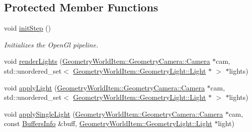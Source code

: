 \subsection*{Protected Member Functions}
\begin{DoxyCompactItemize}
\item 
\mbox{\label{class_geometry_engine_1_1_geometry_render_step_1_1_lighting_pass_aaab2ea74a9710f22887c266af1985490}} 
void \mbox{\hyperlink{class_geometry_engine_1_1_geometry_render_step_1_1_lighting_pass_aaab2ea74a9710f22887c266af1985490}{init\+Step}} ()
\begin{DoxyCompactList}\small\item\em Initializes the Open\+Gl pipeline. \end{DoxyCompactList}\item 
void \mbox{\hyperlink{class_geometry_engine_1_1_geometry_render_step_1_1_lighting_pass_a437ff10a7ef9e7529a4852389a5cf871}{render\+Lights}} (\mbox{\hyperlink{class_geometry_engine_1_1_geometry_world_item_1_1_geometry_camera_1_1_camera}{Geometry\+World\+Item\+::\+Geometry\+Camera\+::\+Camera}} $\ast$cam, std\+::unordered\+\_\+set$<$ \mbox{\hyperlink{class_geometry_engine_1_1_geometry_world_item_1_1_geometry_light_1_1_light}{Geometry\+World\+Item\+::\+Geometry\+Light\+::\+Light}} $\ast$ $>$ $\ast$lights)
\item 
void \mbox{\hyperlink{class_geometry_engine_1_1_geometry_render_step_1_1_lighting_pass_a9d0a0f3b9d52036b9d4f9fbee353cd10}{apply\+Light}} (\mbox{\hyperlink{class_geometry_engine_1_1_geometry_world_item_1_1_geometry_camera_1_1_camera}{Geometry\+World\+Item\+::\+Geometry\+Camera\+::\+Camera}} $\ast$cam, std\+::unordered\+\_\+set$<$ \mbox{\hyperlink{class_geometry_engine_1_1_geometry_world_item_1_1_geometry_light_1_1_light}{Geometry\+World\+Item\+::\+Geometry\+Light\+::\+Light}} $\ast$ $>$ $\ast$lights)
\item 
void \mbox{\hyperlink{class_geometry_engine_1_1_geometry_render_step_1_1_lighting_pass_a958341b3bf1f95dfb56bc5b2833813b0}{apply\+Single\+Light}} (\mbox{\hyperlink{class_geometry_engine_1_1_geometry_world_item_1_1_geometry_camera_1_1_camera}{Geometry\+World\+Item\+::\+Geometry\+Camera\+::\+Camera}} $\ast$cam, const \mbox{\hyperlink{class_geometry_engine_1_1_buffers_info}{Buffers\+Info}} \&buff, \mbox{\hyperlink{class_geometry_engine_1_1_geometry_world_item_1_1_geometry_light_1_1_light}{Geometry\+World\+Item\+::\+Geometry\+Light\+::\+Light}} $\ast$light)

\end{DoxyCompactItemize}

